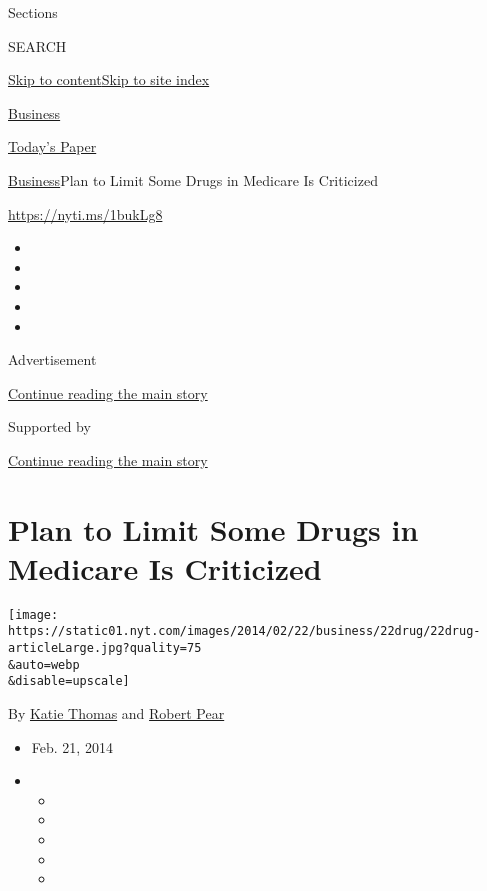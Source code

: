 Sections

SEARCH

\protect\hyperlink{site-content}{Skip to
content}\protect\hyperlink{site-index}{Skip to site index}

\href{https://www.nytimes.com/section/business}{Business}

\href{https://myaccount.nytimes.com/auth/login?response_type=cookie\&client_id=vi}{}

\href{https://www.nytimes.com/section/todayspaper}{Today's Paper}

\href{/section/business}{Business}\textbar{}Plan to Limit Some Drugs in
Medicare Is Criticized

\url{https://nyti.ms/1bukLg8}

\begin{itemize}
\item
\item
\item
\item
\item
\end{itemize}

Advertisement

\protect\hyperlink{after-top}{Continue reading the main story}

Supported by

\protect\hyperlink{after-sponsor}{Continue reading the main story}

\hypertarget{plan-to-limit-some-drugs-in-medicare-is-criticized}{%
\section{Plan to Limit Some Drugs in Medicare Is
Criticized}\label{plan-to-limit-some-drugs-in-medicare-is-criticized}}

\texttt{[image: https://static01.nyt.com/images/2014/02/22/business/22drug/22drug-articleLarge.jpg?quality=75\\\&auto=webp\\\&disable=upscale]}

By \href{http://www.nytimes.com/by/katie-thomas}{Katie Thomas} and
\href{https://www.nytimes.com/by/robert-pear}{Robert Pear}

\begin{itemize}
\item
  Feb. 21, 2014
\item
  \begin{itemize}
  \item
  \item
  \item
  \item
  \item
  \end{itemize}
\end{itemize}


